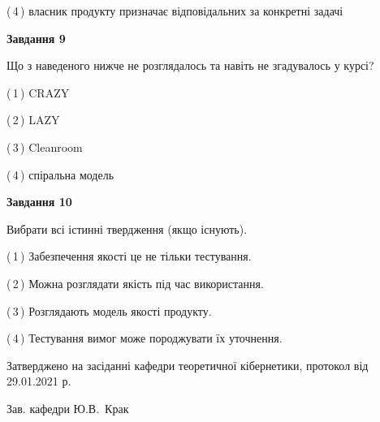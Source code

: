 \documentclass[10pt, ukrainian]{article}
\begin{document}
{\begin {large}
(\,4\,) власник продукту призначає відповідальних за конкретні задачі%


{\begin {center}\textbf{Завдання 9}\end {center}}\par
Що з наведеного нижче не розглядалось та навіть не згадувалось у курсі?\par
\vspace{2mm}



(\,1\,) CRAZY%



(\,2\,) LAZY%



(\,3\,) Cleanroom%



(\,4\,) спіральна модель%


{\begin {center}\textbf{Завдання 10}\end {center}}\par
Вибрати всі істинні твердження (якщо існують).\par
\vspace{2mm}



(\,1\,) Забезпечення якості це не тільки тестування.%



(\,2\,) Можна розглядати якість під час використання.%



(\,3\,) Розглядають модель якості продукту.%



(\,4\,) Тестування вимог може породжувати їх уточнення.%



\end {large}}
{\vspace{5mm}\smallskip \begin {small} Затверджено на засіданні кафедри теоретичної кібернетики, протокол  від   29.01.2021 р.\par\smallskip\smallskip
{\parbox {6.5 cm}{Зав. кафедри \dotfill Ю.В.~Крак}} \end{small}}
\newpage
\end{document}
